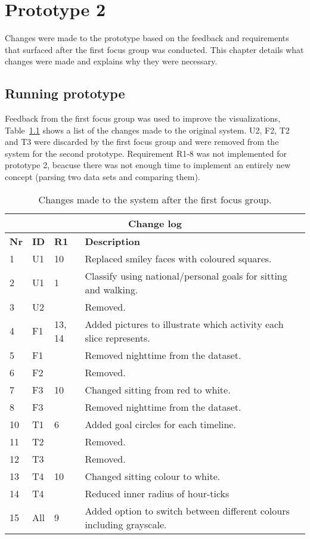 \chapter{Prototype 2}
\label{ch:prototype2}
Changes were made to the prototype based on the feedback and requirements that surfaced after the first focus group was conducted. This chapter details what changes were made and explains why they were necessary.

\section{Running prototype}
\label{sec:runningPrototype2}
Feedback from the first focus group was used to improve the visualizations, Table~\ref{fig:changeLog} shows a list of the changes made to the original system. U2, F2, T2 and T3 were discarded by the first focus group and were removed from the system for the second prototype. Requirement R1-8 was not implemented for prototype 2, beacuse there was not enough time to implement an entirely new concept (parsing two data sets and comparing them).

\begin{table}[h!]
  \centering
  \begin{tabular}{|l|l|l|p{8cm}|}
      \multicolumn{4}{c}{\textbf{Change log}} \\ \hline
      \textbf{Nr} & \textbf{ID} & \textbf{R1} & \textbf{Description} \\ \hline
      1  & U1  & 10       & Replaced smiley faces with coloured squares. \\ \hline
      2  & U1  & 1        & Classify using national/personal goals for sitting and walking.\\ \hline 
      3  & U2  &          & Removed. \\ \hline
      4  & F1  & 13, 14   & Added pictures to illustrate which activity each slice represents. \\ \hline
      5  & F1  &          & Removed nighttime from the dataset. \\ \hline
      6  & F2  &          & Removed. \\ \hline 
      7  & F3  & 10       & Changed sitting from red to white. \\ \hline
      8  & F3  &          & Removed nighttime from the dataset. \\ \hline
      10 & T1  & 6        & Added goal circles for each timeline. \\ \hline
      11 & T2  &          & Removed. \\ \hline
      12 & T3  &          & Removed. \\ \hline
      13 & T4  & 10       & Changed sitting colour to white. \\ \hline
      14 & T4  &          & Reduced inner radius of hour-ticks \\ \hline
      15 & All & 9        & Added option to switch between different colours including grayscale. \\ \hline
  \end{tabular}
  \caption[Changes made after the first focus group]{Changes made to the system after the first focus group.}
  \label{fig:changeLog}
\end{table}

